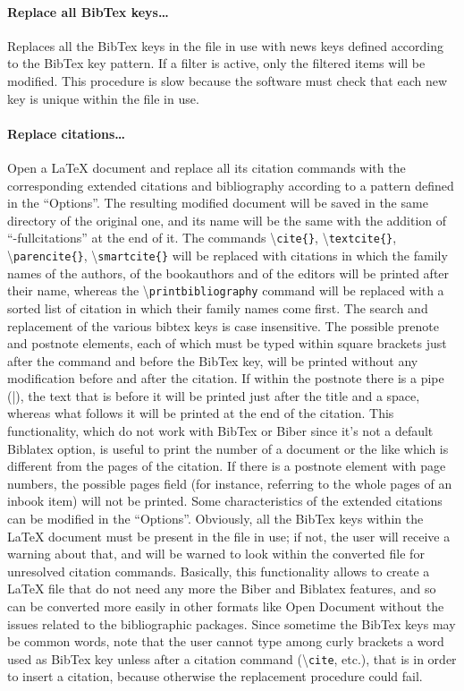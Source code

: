 \documentclass[a4paper,12pt]{report}
\begin{document}
\paragraph{Replace all BibTex keys\dots} Replaces all the BibTex keys in the file in use with news keys defined according to the BibTex key pattern. If a filter is active, only the filtered items will be modified. This procedure is slow because the software must check that each new key is unique within the file in use.

\paragraph{Replace citations\dots} Open a LaTeX document and replace all its citation commands with the corresponding extended citations and bibliography according to a pattern defined in the “Options”. The resulting modified document will be saved in the same directory of the original one, and its name will be the same with the addition of “-fullcitations” at the end of it. The commands \textbackslash \texttt{cite\{\}}, \textbackslash \texttt{textcite\{\}}, \textbackslash \texttt{parencite\{\}}, \textbackslash \texttt{smartcite\{\}} will be replaced with citations in which the family names of the authors, of the bookauthors and of the editors will be printed after their name, whereas the \textbackslash \texttt{printbibliography} command will be replaced with a sorted list of citation in which their family names come first. The search and replacement of the various bibtex keys is case insensitive. The possible prenote and postnote elements, each of which must be typed within square brackets just after the command and before the BibTex key, will be printed without any modification before and after the citation. If within the postnote there is a pipe (|), the text that is before it will be printed just after the title and a space, whereas what follows it will be printed at the end of the citation. This functionality, which do not work with BibTex or Biber since it's not a default Biblatex option, is useful to print the number of a document or the like which is different from the pages of the citation. If there is a postnote element with page numbers, the possible pages field (for instance, referring to the whole pages of an inbook item) will not be printed. Some characteristics of the extended citations can be modified in the “Options”. Obviously, all the BibTex keys within the LaTeX document must be present in the file in use; if not, the user will receive a warning about that, and will be warned to look within the converted file for unresolved citation commands. Basically, this functionality allows to create a LaTeX file that do not need any more the Biber and Biblatex features, and so can be converted more easily in other formats like Open Document without the issues related to the bibliographic packages. Since sometime the BibTex keys may be common words, note that the user cannot type among curly brackets a word used as BibTex key unless after a citation command (\textbackslash \texttt{cite}, etc.), that is in order to insert a citation, because otherwise the replacement procedure could fail.
\end{document}
